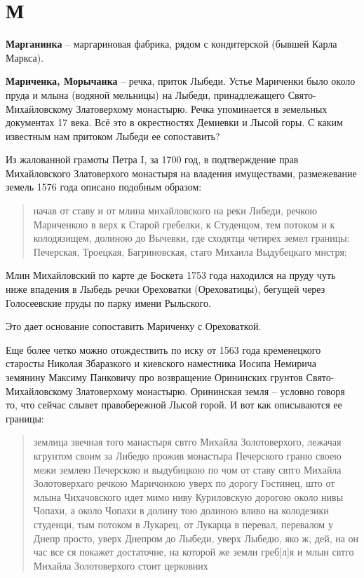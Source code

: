 \chapter*{М}

\textbf{Марганинка} – маргариновая фабрика, рядом с кондитерской (бывшей Карла Маркса).\\

\medskip

\textbf{Мариченка, Морычанка} – речка, приток Лыбеди. Устье Мариченки было около пруда и млына (водяной мельницы) на Лыбеди, принадлежащего Свято-Михайловскому Златоверхому монастырю. Речка упоминается в земельных документах 17 века. Всё это в окрестностях Демиевки и Лысой горы. С каким известным нам притоком Лыбеди ее сопоставить?

Из жалованной грамоты Петра I, за 1700 год, в подтверждение прав Михайловского Златоверхого монастыря на владения имуществами, размежевание земель 1576 года описано подобным образом:

\begin{quotation}
начав от ставу и от млина михайловского на реки Либеди, речкою Мариченкою в верх к Старой гребелки, к Студенцом, тем потоком и к колодязищем, долиною до Вычевки, где сходятца четирех земел границы: Печерская, Троецкая, Багриновская, стаго Михаила Выдубецкаго мнстря;
\end{quotation}

Млин Михайловский по карте де Боскета 1753 года находился на пруду чуть ниже впадения в Лыбедь речки Ореховатки (Ореховатицы), бегущей через Голосеевские пруды по парку имени Рыльского.

Это дает основание сопоставить Мариченку с Ореховаткой.

Еще более четко можно отождествить по иску от 1563 года кременецкого старосты Николая Збаразкого и киевского наместника 
Иосипа Немирича земянину Максиму Панковичу про возвращение Орининских грунтов Свято-Михайловскому Златоверхому монастырю. Орининская земля – условно говоря то, что сейчас слывет правобережной Лысой горой. И вот как описываются ее границы:

\begin{quotation}
землица звечная того манастыря свтго Михайла Золотоверхого, лежачая кгрунтом своим за Либедю прожив монастыра Печерского граню своею межи землею Печерскою и выдубицкою по чом от ставу свтго Михайла Золотоверхаго речкою Маричонкою уверх по дорогу Гостинец, што от млына Чихачовского идет мимо ниву Куриловскую дорогою около нивы Чопахи, а около Чопахи в долину тою долиною вливо на
колодезики студенци, тым потоком в Лукарец, от Лукарца в перевал, перевалом у Днепр просто, уверх Днепром до Лыбеди, уверх Лыбедю, яко ж, дей, на он час все ся покажет достаточне, на которой же земли греб[л]я и млын свтго Михайла Золотоверхого стоит церковних
\end{quotation}

